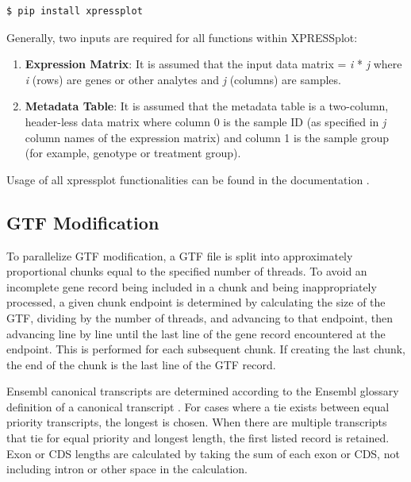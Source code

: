 \documentclass[10pt, oneside]{article}
\begin{document}
\begin{multicols}{2}
\begin{lstlisting}[language=bash, caption=XPRESSplot install]
$ pip install xpressplot
\end{lstlisting}

Generally, two inputs are required for all functions within XPRESSplot:

\begin{enumerate}
  \item \textbf{Expression Matrix}: It is assumed that the input data matrix = \textit{i} * \textit{j} where \textit{i} (rows) are genes or other analytes and \textit{j} (columns) are samples.
  \item \textbf{Metadata Table}: It is assumed that the metadata table is a two-column, header-less data matrix where column 0 is the sample ID (as specified in \textit{j} column names of the expression matrix) and column 1 is the sample group (for example, genotype or treatment group).
\end{enumerate}

Usage of all xpressplot functionalities can be found in the documentation \cite{xpressplot_docs}.

\subsection*{GTF Modification}
To parallelize GTF modification, a GTF file is split into approximately proportional chunks equal to the specified number of threads. To avoid an incomplete gene record being included in a chunk and being inappropriately processed, a given chunk endpoint is determined by calculating the size of the GTF, dividing by the number of threads, and advancing to that endpoint, then advancing line by line until the last line of the gene record encountered at the endpoint. This is performed for each subsequent chunk. If creating the last chunk, the end of the chunk is the last line of the GTF record. \par

Ensembl canonical transcripts are determined according to the Ensembl glossary definition of a canonical transcript \cite{ensembl_canon}. For cases where a tie exists between equal priority transcripts, the longest is chosen. When there are multiple transcripts that tie for equal priority and longest length, the first listed record is retained. Exon or CDS lengths are calculated by taking the sum of each exon or CDS, not including intron or other space in the calculation. \par


\end{multicols}
\end{document}
